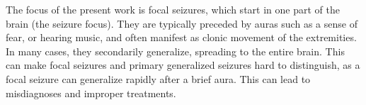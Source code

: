 The focus of the present work is focal seizures, which start in one part of the brain (the seizure focus).
They are typically preceded by auras such as a sense of fear, or hearing music, and often manifest as clonic movement of the extremities.
In many cases, they secondarily generalize, spreading to the entire brain.
This can make focal seizures and primary generalized seizures hard to distinguish, as a focal seizure can generalize rapidly after a brief aura.
This can lead to misdiagnoses and improper treatments.

